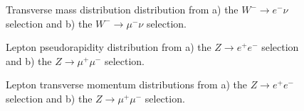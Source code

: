 \begin{figure}[h]
\begin{minipage}[h]{0.49\linewidth}
\end{minipage}
\hfill
\begin{minipage}[h]{0.49\linewidth}
\end{minipage}
\caption{Transverse mass distribution distribution from a) the $W^{-} \to e^{-} \nu$ selection and  b) the $W^{-} \to \mu^{-} \nu$ selection.}
\label{ris:WlnumtWM}
\end{figure}


\begin{figure}[h]
\begin{minipage}[h]{0.49\linewidth}
\end{minipage}
\hfill
\begin{minipage}[h]{0.49\linewidth}
\end{minipage}
\caption{ Lepton pseudorapidity distribution from  a) the $Z\to e^{+}e^{-}$ selection and b) the $Z\to \mu^{+}\mu^{-}$ selection.}
\label{ris:Zll}
\end{figure}

\begin{figure}[h]
\begin{minipage}[h]{0.49\linewidth}
\end{minipage}
\hfill
\begin{minipage}[h]{0.49\linewidth}
\end{minipage}
\caption{Lepton transverse momentum distributions from a) the $Z\to e^{+}e^{-}$ selection and b) the $Z\to \mu^{+}\mu^{-}$ selection.}

\end{figure}

